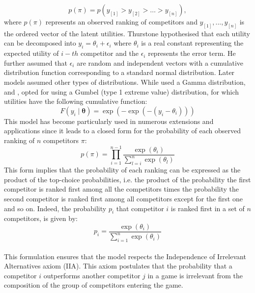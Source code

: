 \begin{equation*}
p(\pi) = p(y_{[1]} > y_{[2]} > \dots > y_{[n]}),
\end{equation*}
where $p(\pi)$ represents an observed ranking of competitors and $y_{[1]},...,y_{[n]}$ is the ordered vector of the latent utilities.
 Thurstone  hypothesised that each utility can be decomposed into $y_i=\theta_i+\epsilon_i$ where $\theta_i$  is a real constant representing the expected utility of  $i-th$ competitor and the $\epsilon_i$   represents the error term. He further assumed that $\epsilon_i$ are random and independent vectors with a cumulative distribution function corresponding to a standard normal distribution. Later models assumed other types of distributions. While \cite{henery1983permutation} used a Gamma distribution, \cite{luce1959possible} and \cite{plackett1975analysis}, opted for using  a Gumbel (type 1 extreme value) distribution, for which utilities have the following cumulative function:
\begin{equation*}
F(y_i \mid \boldsymbol{\theta}) = \exp\left(-\exp(-(y_i - \theta_i))\right)
\end{equation*} 
This model has become particularly used in numerous extensions and applications since it leads to a closed form for the probability of each observed ranking of $n$ competitors  $\pi$:
\begin{equation*} 
p(\pi) = \prod_{i=1}^{n-1}  \frac{\exp(\theta_{i})}{\sum_{l=i}^{n} \exp(\theta_{l})} 
\end{equation*} 
This  form implies that the probability of each ranking can be expressed as the product of the top-choice probabilities, i.e. the product of the probability the first competitor is ranked first among all the competitors times the probability the second competitor is ranked first among all competitors except for the first one and so on. Indeed, the probability $p_{i}$ that competitor $i$ is ranked first in a set of $n$ competitors, is given by:
\begin{equation*}
p_{i} = \frac{\exp(\theta_{i})}{\sum_{i=1}^{n} \exp(\theta_{i})}
\end{equation*}
\\
This formulation ensures that the model respects the Independence of Irrelevant Alternatives axiom (IIA)\parencite{tversky1972elimination}. This axiom postulates that the probability that a competitor $i$ outperforms another competitor $j$ in a game is irrelevant from the composition of the group of competitors entering the game.\\
